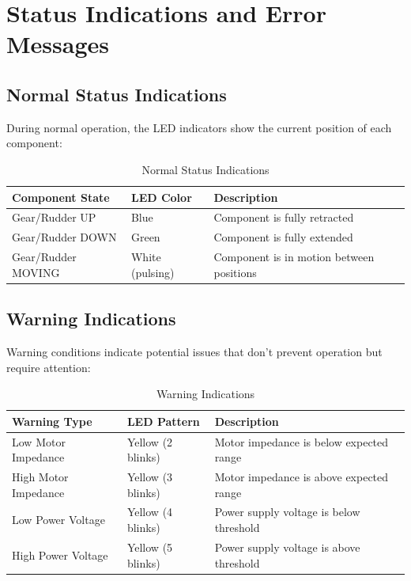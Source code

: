 \documentclass[12pt,a4paper,twoside,openright]{book}
\newcommand{\tabletextfont}{\normalfont\rmfamily}
\newcommand{\tableheadfont}{\normalfont\bfseries}
\begin{document}
\section{Status Indications and Error Messages}

\subsection{Normal Status Indications}
During normal operation, the LED indicators show the current position of each component:

\begin{table}[h]
\centering
\setlength{\tabcolsep}{5pt} %
\begin{tabular}{|p{}|p{}|p{}|}
\hline
\tableheadfont\textbf{Component State} & \tableheadfont\textbf{LED Color} & \tableheadfont\textbf{Description} \\
\hline
\tabletextfont Gear/Rudder UP & Blue & Component is fully retracted \\
\hline
\tabletextfont Gear/Rudder DOWN & Green & Component is fully extended \\
\hline
\tabletextfont Gear/Rudder MOVING & White (pulsing) & Component is in motion between positions \\
\hline
\end{tabular}
\caption{Normal Status Indications}
\end{table}

\subsection{Warning Indications}
Warning conditions indicate potential issues that don't prevent operation but require attention:

\begin{table}[h]
\centering
\setlength{\tabcolsep}{5pt} %
\begin{tabular}{|p{}|p{}|p{}|}
\hline
\tableheadfont\textbf{Warning Type} & \tableheadfont\textbf{LED Pattern} & \tableheadfont\textbf{Description} \\
\hline
\tabletextfont Low Motor Impedance & Yellow (2 blinks) & Motor impedance is below expected range \\
\hline
\tabletextfont High Motor Impedance & Yellow (3 blinks) & Motor impedance is above expected range \\
\hline
\tabletextfont Low Power Voltage & Yellow (4 blinks) & Power supply voltage is below threshold \\
\hline
\tabletextfont High Power Voltage & Yellow (5 blinks) & Power supply voltage is above threshold \\
\hline
\end{tabular}
\caption{Warning Indications}
\end{table}
\end{document}
